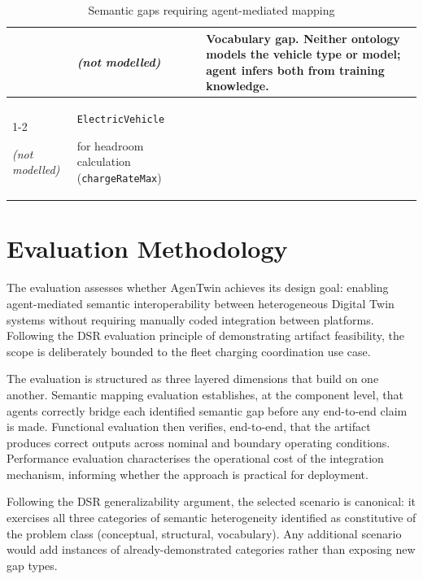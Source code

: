 \begin{table}[H]
\begin{tabular}{ | m{4cm} | m{4cm} | m{5cm} | }
            &

            \emph{(not modelled)}

            &

            \multirow{2}{=}{Vocabulary gap. 
            Neither ontology models the vehicle type or model;
            agent infers both from training knowledge.} \\
        \cline{1-2}

            \emph{(not modelled)}

            &

            \texttt{ElectricVehicle}

            for headroom calculation (\texttt{chargeRateMax})

            & \\
        \hline

    \end{tabular}
    \caption{Semantic gaps requiring agent-mediated mapping}
    \label{tab:semantic-gaps}
\end{table}

\section{Evaluation Methodology}
\label{sec:evaluation-methodology}

The evaluation assesses whether AgenTwin achieves its design goal:
    enabling agent-mediated semantic interoperability between heterogeneous Digital Twin systems
    without requiring manually coded integration between platforms.
Following the DSR evaluation principle of demonstrating artifact feasibility,
    the scope is deliberately bounded to the fleet charging coordination use case.

The evaluation is structured as three layered dimensions that build on one another.
Semantic mapping evaluation establishes, at the component level, that agents correctly
    bridge each identified semantic gap before any end-to-end claim is made.
Functional evaluation then verifies, end-to-end, that the artifact produces correct
    outputs across nominal and boundary operating conditions.
Performance evaluation characterises the operational cost of the integration mechanism,
    informing whether the approach is practical for deployment.

Following the DSR generalizability argument, the selected scenario is canonical:
    it exercises all three categories of semantic heterogeneity identified as
    constitutive of the problem class (conceptual, structural, vocabulary).
Any additional scenario would add instances of already-demonstrated categories
    rather than exposing new gap types.

